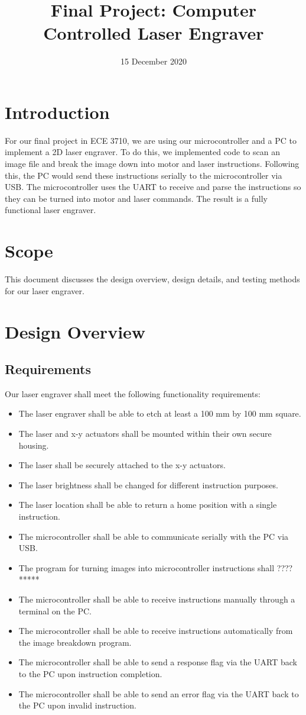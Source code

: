 \documentclass[11pt]{LaTeX-Classes/math-hw}
\title{Final Project: Computer Controlled Laser Engraver}
\date{15 December 2020}
\begin{document}
\maketitle

\section*{Introduction}
For our final project in ECE 3710, we are using our microcontroller and a PC to implement a 2D laser engraver.
To do this, we implemented code to scan an image file and break the image down into motor and laser instructions.
Following this, the PC would send these instructions serially to the microcontroller via USB. The microcontroller
uses the UART to receive and parse the instructions so they can be turned into motor and laser commands. The result
is a fully functional laser engraver.

\section*{Scope}
This document discusses the design overview, design details, and testing methods for our laser engraver.

\section*{Design Overview}
\subsection{Requirements}
Our laser engraver shall meet the following functionality requirements:
\begin{itemize}
	\item The laser engraver shall be able to etch at least a 100 mm by 100 mm square.
	\item The laser and x-y actuators shall be mounted within their own secure housing.
	\item The laser shall be securely attached to the x-y actuators.
	\item The laser brightness shall be changed for different instruction purposes.
	\item The laser location shall be able to return a home position with a single instruction.
	\item The microcontroller shall be able to communicate serially with the PC via USB.
	\item The program for turning images into microcontroller instructions shall ????*****
	\item The microcontroller shall be able to receive instructions manually through a terminal on the PC.
	\item The microcontroller shall be able to receive instructions automatically from the image breakdown program.
	\item The microcontroller shall be able to send a response flag via the UART back to the PC upon instruction completion.
	\item The microcontroller shall be able to send an error flag via the UART back to the PC upon invalid instruction.
	
\end{itemize}
\end{document}
